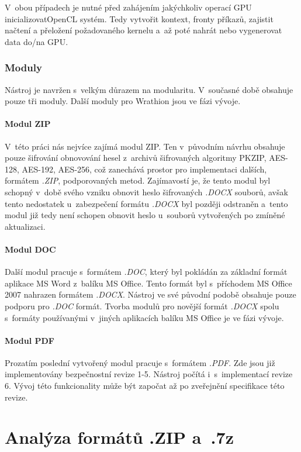  V~obou případech je nutné před zahájením jakýchkoliv operací GPU
 inicializovat\linebreak OpenCL systém. Tedy vytvořit kontext, fronty příkazů, zajistit načtení a
 přeložení požadovaného kernelu a~až poté nahrát nebo vygenerovat data do/na GPU.

\subsection{Moduly}
Nástroj je navržen s~velkým důrazem na modularitu. V~současné době obsahuje pouze tři moduly.
Další moduly pro Wrathion jsou ve fázi vývoje.

\subsubsection{Modul ZIP}
V~této práci nás nejvíce zajímá modul ZIP. Ten v~původním návrhu obsahuje pouze šifrování
obnovování hesel z~archivů šifrovaných algoritmy PKZIP, AES-128, AES-192, AES-256, což zanechává
prostor pro implementaci dalších, formátem {\it .ZIP}, podporovaných metod. Zajímavostí je, že
tento modul byl schopný v~době svého vzniku obnovit heslo šifrovaných {\it .DOCX} souborů, avšak
tento nedostatek u~zabezpečení formátu {\it .DOCX} byl později odstraněn a~tento modul již tedy
není schopen obnovit heslo u~souborů vytvořených po zmíněné aktualizaci.

\subsubsection{Modul DOC}
Další modul pracuje s~formátem {\it .DOC}, který byl pokládán za základní formát aplikace MS Word
z~balíku MS Office. Tento formát byl s~příchodem MS Office 2007 nahrazen formátem {\it .DOCX}.
Nástroj ve své původní podobě obsahuje pouze podporu pro {\it .DOC} formát. Tvorba modulů pro
novější formát {\it .DOCX} spolu s~formáty používanými v~jiných aplikacích balíku MS Office je ve
fázi vývoje.

\subsubsection{Modul PDF}
Prozatím poslední vytvořený modul pracuje s~formátem {\it .PDF}. Zde jsou již implementovány
bezpečnostní revize 1-5. Nástroj počítá i~s~implementací revize 6. Vývoj této funkcionality může
být započat až po zveřejnění specifikace této revize.

\chapter{Analýza formátů .ZIP a~.7z}
\label{ch:formaty}
